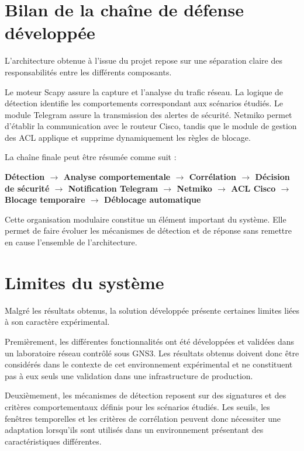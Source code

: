 \section{Bilan de la chaîne de défense développée}

L'architecture obtenue à l'issue du projet repose sur une séparation claire des responsabilités entre les différents composants.

Le moteur Scapy assure la capture et l'analyse du trafic réseau. La logique de détection identifie les comportements correspondant aux scénarios étudiés. Le module Telegram assure la transmission des alertes de sécurité. Netmiko permet d'établir la communication avec le routeur Cisco, tandis que le module de gestion des ACL applique et supprime dynamiquement les règles de blocage.

La chaîne finale peut être résumée comme suit :

\begin{center}
\textbf{
Détection
$\rightarrow$
Analyse comportementale
$\rightarrow$
Corrélation
$\rightarrow$
Décision de sécurité
$\rightarrow$
Notification Telegram
$\rightarrow$
Netmiko
$\rightarrow$
ACL Cisco
$\rightarrow$
Blocage temporaire
$\rightarrow$
Déblocage automatique
}
\end{center}

Cette organisation modulaire constitue un élément important du système. Elle permet de faire évoluer les mécanismes de détection et de réponse sans remettre en cause l'ensemble de l'architecture.


\section{Limites du système}

Malgré les résultats obtenus, la solution développée présente certaines limites liées à son caractère expérimental.

Premièrement, les différentes fonctionnalités ont été développées et validées dans un laboratoire réseau contrôlé sous GNS3. Les résultats obtenus doivent donc être considérés dans le contexte de cet environnement expérimental et ne constituent pas à eux seuls une validation dans une infrastructure de production.

Deuxièmement, les mécanismes de détection reposent sur des signatures et des critères comportementaux définis pour les scénarios étudiés. Les seuils, les fenêtres temporelles et les critères de corrélation peuvent donc nécessiter une adaptation lorsqu'ils sont utilisés dans un environnement présentant des caractéristiques différentes.


